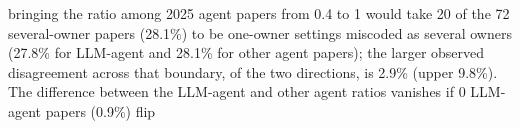 bringing the ratio among 2025 agent papers from 0.4 to 1 would take 20 of the 72 several-owner papers (28.1\%) to be one-owner settings miscoded as several owners (27.8\% for LLM-agent and 28.1\% for other agent papers); the larger observed disagreement across that boundary, of the two directions, is 2.9\% (upper 9.8\%). The difference between the LLM-agent and other agent ratios vanishes if 0 LLM-agent papers (0.9\%) flip
